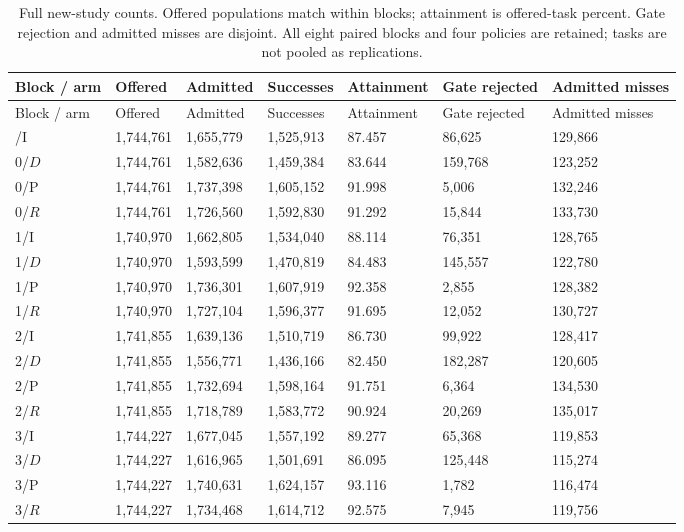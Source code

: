 \documentclass[12pt,a4paper]{article}
\begin{document}
\begingroup
\singlespacing\footnotesize\setlength{\tabcolsep}{3pt}
\renewcommand{\thetable}{E1}
\begin{xltabular}{\textwidth}{@{}YYYYYYY@{}}
\caption[All confirmation cells]{Full new-study counts. Offered populations match within blocks; attainment is offered-task percent. Gate rejection and admitted misses are disjoint. All eight paired blocks and four policies are retained; tasks are not pooled as replications.}\label{tab:E1} \\
\toprule
Block / arm & Offered & Admitted & Successes & Attainment & Gate rejected & Admitted misses \\
\midrule\endfirsthead
\toprule
Block / arm & Offered & Admitted & Successes & Attainment & Gate rejected & Admitted misses \\
\midrule\endhead
\bottomrule{}/I & 1,744,761 & 1,655,779 & 1,525,913 & 87.457 & 86,625 & 129,866 \\
0/$D$ & 1,744,761 & 1,582,636 & 1,459,384 & 83.644 & 159,768 & 123,252 \\
0/P & 1,744,761 & 1,737,398 & 1,605,152 & 91.998 & 5,006 & 132,246 \\
0/$R$ & 1,744,761 & 1,726,560 & 1,592,830 & 91.292 & 15,844 & 133,730 \\
1/I & 1,740,970 & 1,662,805 & 1,534,040 & 88.114 & 76,351 & 128,765 \\
1/$D$ & 1,740,970 & 1,593,599 & 1,470,819 & 84.483 & 145,557 & 122,780 \\
1/P & 1,740,970 & 1,736,301 & 1,607,919 & 92.358 & 2,855 & 128,382 \\
1/$R$ & 1,740,970 & 1,727,104 & 1,596,377 & 91.695 & 12,052 & 130,727 \\
2/I & 1,741,855 & 1,639,136 & 1,510,719 & 86.730 & 99,922 & 128,417 \\
2/$D$ & 1,741,855 & 1,556,771 & 1,436,166 & 82.450 & 182,287 & 120,605 \\
2/P & 1,741,855 & 1,732,694 & 1,598,164 & 91.751 & 6,364 & 134,530 \\
2/$R$ & 1,741,855 & 1,718,789 & 1,583,772 & 90.924 & 20,269 & 135,017 \\
3/I & 1,744,227 & 1,677,045 & 1,557,192 & 89.277 & 65,368 & 119,853 \\
3/$D$ & 1,744,227 & 1,616,965 & 1,501,691 & 86.095 & 125,448 & 115,274 \\
3/P & 1,744,227 & 1,740,631 & 1,624,157 & 93.116 & 1,782 & 116,474 \\
3/$R$ & 1,744,227 & 1,734,468 & 1,614,712 & 92.575 & 7,945 & 119,756 \\

\end{xltabular}
\end{document}
